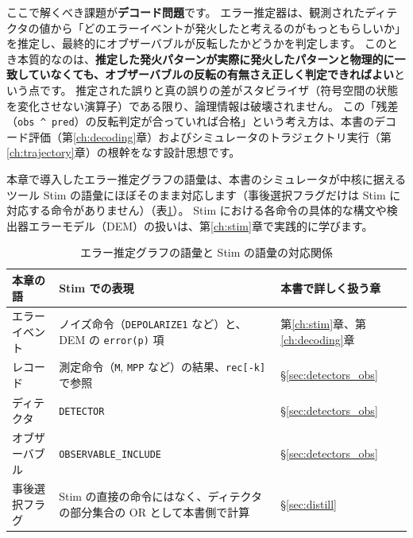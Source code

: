 ここで解くべき課題が\textbf{デコード問題}です。
エラー推定器は、観測されたディテクタの値から「どのエラーイベントが発火したと考えるのがもっともらしいか」を推定し、最終的にオブザーバブルが反転したかどうかを判定します。
このとき本質的なのは、\textbf{推定した発火パターンが実際に発火したパターンと物理的に一致していなくても、オブザーバブルの反転の有無さえ正しく判定できればよい}という点です。
推定された誤りと真の誤りの差がスタビライザ（符号空間の状態を変化させない演算子）である限り、論理情報は破壊されません。
この「残差（\texttt{obs \textasciicircum\ pred}）の反転判定が合っていれば合格」という考え方は、本書のデコード評価（第\ref{ch:decoding}章）およびシミュレータのトラジェクトリ実行（第\ref{ch:trajectory}章）の根幹をなす設計思想です。

本章で導入したエラー推定グラフの語彙は、本書のシミュレータが中核に据えるツール Stim\cite{gidney2021stim} の語彙にほぼそのまま対応します（事後選択フラグだけは Stim に対応する命令がありません）（表\ref{tab:ch2_error_graph_stim}）。
Stim における各命令の具体的な構文や検出器エラーモデル（DEM）の扱いは、第\ref{ch:stim}章で実践的に学びます。

\begin{table}[htbp]
  \centering
  \caption{エラー推定グラフの語彙と Stim の語彙の対応関係}
  \label{tab:ch2_error_graph_stim}
  \begin{tabularx}{\textwidth}{>{\raggedright\arraybackslash}p{}>{\raggedright\arraybackslash}X>{\raggedright\arraybackslash}p{}}
    \hline
    \textbf{本章の語} & \textbf{Stim での表現} & \textbf{本書で詳しく扱う章} \\
    \hline
    エラーイベント & ノイズ命令（\texttt{DEPOLARIZE1} など）と、DEM の \texttt{error(p)} 項 & 第\ref{ch:stim}章、第\ref{ch:decoding}章 \\
    レコード & 測定命令（\texttt{M}, \texttt{MPP} など）の結果、\texttt{rec[-k]} で参照 & §\ref{sec:detectors_obs} \\
    ディテクタ & \texttt{DETECTOR} & §\ref{sec:detectors_obs} \\
    オブザーバブル & \texttt{OBSERVABLE\_INCLUDE} & §\ref{sec:detectors_obs} \\
    事後選択フラグ & Stim の直接の命令にはなく、ディテクタの部分集合の OR として本書側で計算 & §\ref{sec:distill} \\
    \hline
  \end{tabularx}
\end{table}

